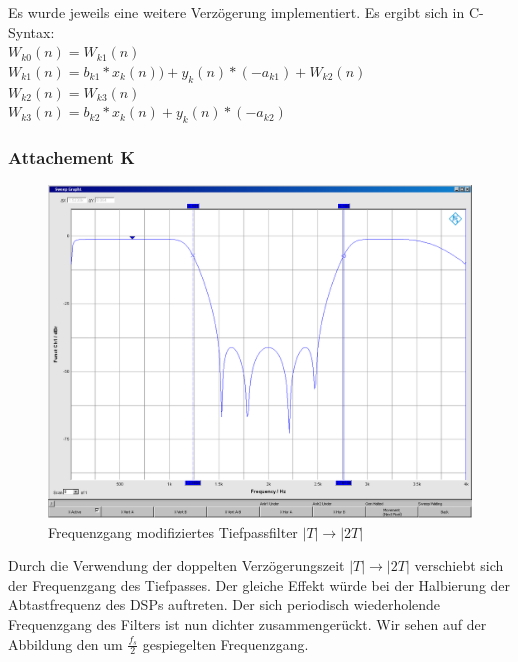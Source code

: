 \noindent Es wurde jeweils eine weitere Verzögerung implementiert. Es ergibt sich in C-Syntax:\\
$W_{k0}(n)=W_{k1}(n)$\\
$W_{k1}(n)=b_{k1}*x_k(n))+y_k(n)*(-a_{k1})+W_{k2}(n)$\\
$W_{k2}(n)=W_{k3}(n)$\\
$W_{k3}(n)=b_{k2}*x_k(n)+y_k(n)*(-a_{k2})$

\clearpage

\subsubsection{Attachement K}

	\begin{figure}[h]
		\centering
		\includegraphics[width=0.7\linewidth]{Bilder/ellip2T}
		\caption{Frequenzgang modifiziertes Tiefpassfilter $|T| \rightarrow |2T|$}
		\label{fig:ellip2T}
	\end{figure}
	
\noindent Durch die Verwendung der doppelten Verzögerungszeit $|T| \rightarrow |2T|$ verschiebt sich der Frequenzgang des Tiefpasses. Der gleiche Effekt würde bei der Halbierung der Abtastfrequenz des DSPs auftreten. Der sich periodisch wiederholende Frequenzgang des Filters ist nun dichter zusammengerückt. Wir sehen auf der Abbildung den um $\frac{f_s}{2}$ gespiegelten Frequenzgang. 
